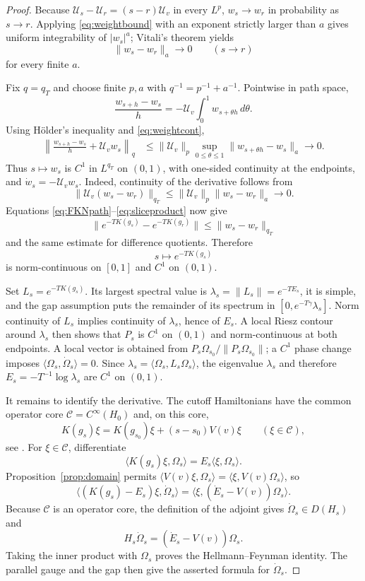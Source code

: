 \documentclass[11pt,a4paper]{article}
\theoremstyle{remark}
\newcommand{\Om}{\Omega}
\begin{document}
\begin{proof}
Because $\mathcal U_s-\mathcal U_r=(s-r)\mathcal U_v$ in every $L^p$, $w_s\to w_r$ in
probability as $s\to r$.  Applying \eqref{eq:weightbound} with an exponent strictly larger than
$a$ gives uniform integrability of $|w_s|^a$; Vitali's theorem yields
\begin{equation}\label{eq:weightcont}
 \|w_s-w_r\|_a\longrightarrow0\qquad(s\to r)                 \tag{4.6}
\end{equation}
for every finite $a$.

Fix $q=q_T$ and choose finite $p,a$ with $q^{-1}=p^{-1}+a^{-1}$.  Pointwise in path space,
\[
 \frac{w_{s+h}-w_s}{h}
 =-\mathcal U_v\int_0^1w_{s+\theta h}\,d\theta.
\]
Using H\"older's inequality and \eqref{eq:weightcont},
\begin{align*}
 \left\|\frac{w_{s+h}-w_s}{h}+\mathcal U_vw_s\right\|_q
 &\le\|\mathcal U_v\|_p
       \sup_{0\le\theta\le1}\|w_{s+\theta h}-w_s\|_a
 \longrightarrow0.
\end{align*}
Thus $s\mapsto w_s$ is $C^1$ in $L^{q_T}$ on $(0,1)$, with one-sided continuity at the endpoints,
and $\dot w_s=-\mathcal U_vw_s$.  Indeed, continuity of the derivative follows from
\[
 \|\mathcal U_v(w_s-w_r)\|_{q_T}
 \le\|\mathcal U_v\|_p\|w_s-w_r\|_a\longrightarrow0.
\]
Equations \eqref{eq:FKNpath}--\eqref{eq:sliceproduct} now give
\[
 \|e^{-TK(g_s)}-e^{-TK(g_r)}\|
 \le\|w_s-w_r\|_{q_T}
\]
and the same estimate for difference quotients.  Therefore
\[
 s\longmapsto e^{-TK(g_s)}
\]
is norm-continuous on $[0,1]$ and $C^1$ on $(0,1)$.

Set $L_s=e^{-TK(g_s)}$.  Its largest spectral value is
$\lambda_s=\|L_s\|=e^{-TE_s}$, it is simple, and the gap assumption puts the remainder of its
spectrum in $[0,e^{-T\gamma}\lambda_s]$.  Norm continuity of $L_s$ implies continuity of
$\lambda_s$, hence of $E_s$.  A local Riesz contour around $\lambda_s$ then shows that $P_s$ is
$C^1$ on $(0,1)$ and norm-continuous at both endpoints.  A local vector is obtained from
$P_s\Om_{s_0}/\|P_s\Om_{s_0}\|$; a $C^1$ phase change imposes
$\langle\Om_s,\dot\Om_s\rangle=0$.  Since
$\lambda_s=\langle\Om_s,L_s\Om_s\rangle$, the eigenvalue $\lambda_s$ and therefore
$E_s=-T^{-1}\log\lambda_s$ are $C^1$ on $(0,1)$.

It remains to identify the derivative.  The cutoff Hamiltonians have the common operator core
$\mathscr C=C^\infty(H_0)$ and, on this core,
\[
 K(g_s)\xi=K(g_{s_0})\xi+(s-s_0)V(v)\xi
 \qquad(\xi\in\mathscr C),
\]
see \cite[Thm.~V.12(a)]{Simon}.  For $\xi\in\mathscr C$, differentiate
\[
 \langle K(g_s)\xi,\Om_s\rangle=E_s\langle\xi,\Om_s\rangle.
\]
Proposition~\ref{prop:domain} permits
$\langle V(v)\xi,\Om_s\rangle=\langle\xi,V(v)\Om_s\rangle$, so
\[
 \langle (K(g_s)-E_s)\xi,\dot\Om_s\rangle
 =\langle\xi,(\dot E_s-V(v))\Om_s\rangle.
\]
Because $\mathscr C$ is an operator core, the definition of the adjoint gives
$\dot\Om_s\in D(H_s)$ and
\[
 H_s\dot\Om_s=(\dot E_s-V(v))\Om_s.
\]
Taking the inner product with $\Om_s$ proves the Hellmann--Feynman identity.  The parallel gauge
and the gap then give the asserted formula for $\dot\Om_s$.


\end{proof}
\end{document}
